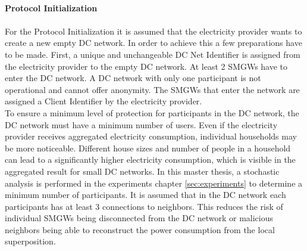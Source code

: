 \\
\textbf{Protocol Initialization}
\\
\\
For the Protocol Initialization it is assumed that the electricity provider wants to create a new empty DC network. In order to achieve this a few preparations have to be made. First, a unique and unchangeable DC Net Identifier is assigned from the electricity provider to the empty DC network. At least 2 \gls{SMGW}s have to enter the DC network. A DC network with only one participant is not operational and cannot offer anonymity. 
The \gls{SMGW}s that enter the network are assigned a Client Identifier by the electricity provider.\\
To ensure a minimum level of protection for participants in the DC network, the DC network must have a minimum number of users. Even if the electricity provider receives aggregated electricity consumption, individual households may be more noticeable. Different house sizes and number of people in a household can lead to a significantly higher electricity consumption, which is visible in the aggregated result for small DC networks. In this master thesis, a stochastic analysis is performed in the experiments chapter \ref{sec:experiments} to determine a minimum number of participants. It is assumed that in the DC network each participants has at least 3 connections to neighbors. This reduces the risk of individual \gls{SMGW}s being disconnected from the DC network or malicious neighbors being able to reconstruct the power consumption from the local superposition.\\
